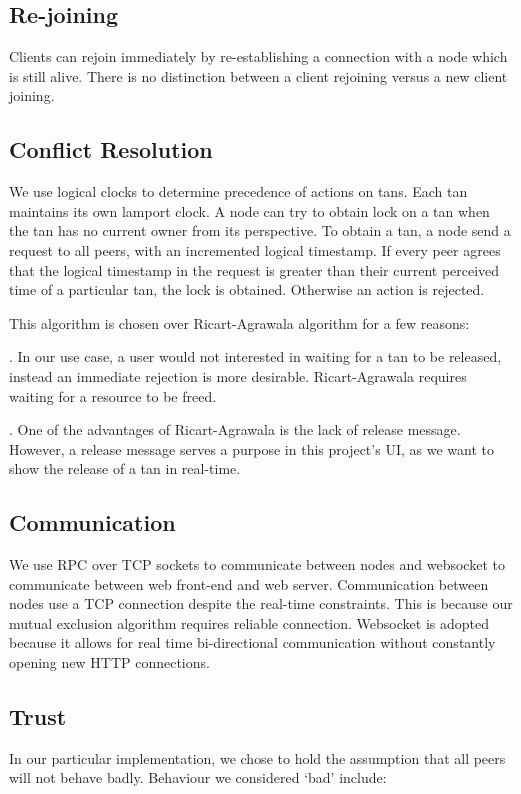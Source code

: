 \documentclass[twocolumn]{article}
\begin{document}
\subsection{Re-joining}
Clients can rejoin immediately by re-establishing a connection with a node which is still alive. There is no distinction between a client rejoining versus a new client joining.


\subsection{Conflict Resolution}
We use logical clocks to determine precedence of actions on tans. Each tan maintains its own lamport clock. A node can try to obtain lock on a tan when the tan has no current owner from its perspective. To obtain a tan, a node send a request to all peers, with an incremented logical timestamp. If every peer agrees that the logical timestamp in the request is greater than their current perceived time of a particular tan, the lock is obtained. Otherwise an action is rejected.

This algorithm is chosen over Ricart-Agrawala algorithm for a few reasons:

. In our use case, a user would not interested in waiting for a tan to be released, instead an immediate rejection is more desirable. Ricart-Agrawala requires waiting for a resource to be freed.

. One of the advantages of Ricart-Agrawala is the lack of release message. However, a release message serves a purpose in this project's UI, as we want to show the release of a tan in real-time.

\subsection{Communication}
We use RPC over TCP sockets to communicate between nodes and websocket to communicate between web front-end and web server. Communication between nodes use a TCP connection despite the real-time constraints. This is because our mutual exclusion algorithm requires reliable connection. Websocket is adopted because it allows for real time bi-directional communication without constantly opening new HTTP connections.

\subsection{Trust}
In our particular implementation, we chose to hold the assumption that all peers will not behave badly. Behaviour we considered ‘bad’ include:
\end{document}

